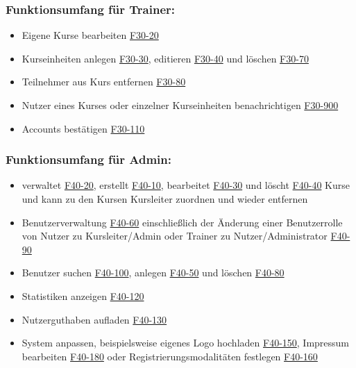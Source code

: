 \documentclass[a4paper]{scrreprt}
\begin{document}
		\subsubsection{Funktionsumfang für \gls{Trainer}:}
			\begin{itemize}
				\item Eigene Kurse bearbeiten \hyperlink{kursEdit}{F30-20}
				\item Kurseinheiten anlegen \hyperlink{kurseinheitAnlegen}{F30-30}, editieren \hyperlink{kurseinheitEdit}{F30-40} und löschen \hyperlink{kurseinheitLoeschen}{F30-70}
				\item Teilnehmer aus Kurs entfernen \hyperlink{kursUserDel}{F30-80}
				\item Nutzer eines Kurses oder einzelner Kurseinheiten benachrichtigen \hyperlink{kursUserMsg}{F30-900}
				\item Accounts bestätigen \hyperlink{addUserKL}{F30-110}
			\end{itemize}
		\subsubsection{Funktionsumfang für \gls{Admin}:}
			\begin{itemize}
				\item verwaltet \hyperlink{kursVerwalt}{F40-20}, erstellt \hyperlink{kursErstellen}{F40-10}, bearbeitet \hyperlink{kursBearbeiten}{F40-30} und löscht \hyperlink{kursLoeschen}{F40-40} Kurse und kann zu den Kursen Kursleiter zuordnen \hyperlink{kursKLAdd}{} und wieder entfernen \hyperlink{kursKLDel}{}
				\item Benutzerverwaltung \hyperlink{nutzerVerwalt}{F40-60} einschließlich der Änderung einer Benutzerrolle von Nutzer zu Kursleiter/\gls{Admin} oder \gls{Trainer} zu Nutzer/Administrator \hyperlink{nutzerRolle}{F40-90}
				\item Benutzer suchen \hyperlink{nutzerSuchen}{F40-100}, anlegen \hyperlink{nutzerAnlegen}{F40-50} und löschen \hyperlink{nutzerLoeschen}{F40-80}
				\item Statistiken anzeigen \hyperlink{statistik}{F40-120}
				\item Nutzerguthaben aufladen \hyperlink{guthabenAuf}{F40-130}
				\item System anpassen, beispielsweise eigenes Logo hochladen \hyperlink{logo}{F40-150}, Impressum bearbeiten \hyperlink{impressumBea}{F40-180} oder Registrierungsmodalitäten festlegen \hyperlink{regMod}{F40-160}
			\end{itemize}
			
\end{document}
